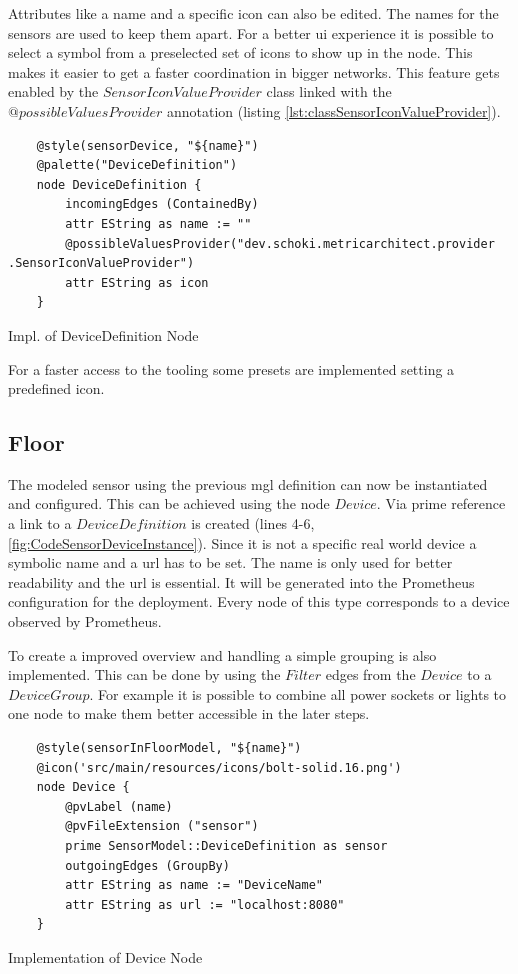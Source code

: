 Attributes like a name and a specific icon  can also be edited. The names for the sensors are used to keep them apart. For a better \gls{ui} experience it is possible to select a symbol from a preselected set of icons to show up in the node. This makes it easier to get a faster coordination in bigger networks. This feature gets enabled by the $SensorIconValueProvider$ class linked with the $@possibleValuesProvider$ annotation (listing \ref{lst:classSensorIconValueProvider}).
\begin{listing}[H]
	\begin{verbatim}
	@style(sensorDevice, "${name}")
	@palette("DeviceDefinition")
	node DeviceDefinition {
		incomingEdges (ContainedBy)
		attr EString as name := ""
		@possibleValuesProvider("dev.schoki.metricarchitect.provider .SensorIconValueProvider")
		attr EString as icon
	}	
	\end{verbatim}
	\caption{Impl. of DeviceDefinition Node}
	\label{fig:CodeSensorDevice}
\end{listing}
For a faster access to the tooling some presets are implemented setting a predefined icon.
\subsection{Floor}
The modeled sensor using the previous \gls{mgl} definition can now be instantiated and configured. This can be achieved using the node $Device$. Via prime reference a link to a $DeviceDefinition$ is created (lines 4-6, \ref{fig:CodeSensorDeviceInstance}). Since it is not a specific real world device a symbolic name and a \gls{url} has to be set. The name is only used for better readability and the \gls{url} is essential. It will be generated into the Prometheus configuration for the deployment. Every node of this type corresponds to a device observed by Prometheus. 

To create a improved overview and handling a simple grouping is also implemented. This can be done by using the $Filter$ edges from the $Device$ to a $DeviceGroup$. For example it is possible to combine all power sockets or lights to one node to make them better accessible in the later steps. 

\begin{listing}[H]
	\begin{verbatim}
	@style(sensorInFloorModel, "${name}")
	@icon('src/main/resources/icons/bolt-solid.16.png')
	node Device {
		@pvLabel (name)
		@pvFileExtension ("sensor")
		prime SensorModel::DeviceDefinition as sensor
		outgoingEdges (GroupBy)
		attr EString as name := "DeviceName"
		attr EString as url := "localhost:8080"
	}	
	\end{verbatim}
	\caption{Implementation of Device Node}
	\label{fig:CodeSensorDeviceInstance}
\end{listing}

